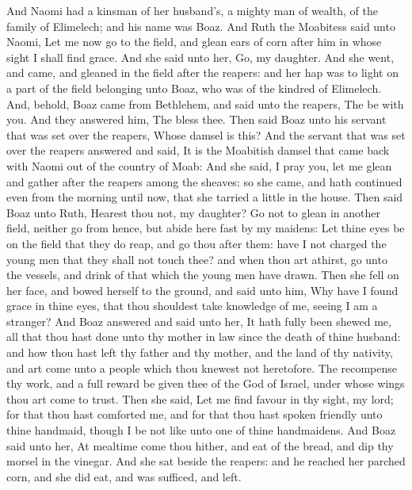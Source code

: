 \begin{biblechapter} %
 And Naomi had a kinsman of her husband's, a mighty man of wealth, of the family of Elimelech; and his name was Boaz.
\verse And Ruth the Moabitess said unto Naomi, Let me now go to the field, and glean ears of corn after him in whose sight I shall find grace. And she said unto her, Go, my daughter.
\verse And she went, and came, and gleaned in the field after the reapers: and her hap was to light on a part of the field belonging unto Boaz, who was of the kindred of Elimelech.
\verse And, behold, Boaz came from Bethlehem, and said unto the reapers, The \LORD be with you. And they answered him, The \LORD bless thee.
\verse Then said Boaz unto his servant that was set over the reapers, Whose damsel is this?
\verse And the servant that was set over the reapers answered and said, It is the Moabitish damsel that came back with Naomi out of the country of Moab:
\verse And she said, I pray you, let me glean and gather after the reapers among the sheaves: so she came, and hath continued even from the morning until now, that she tarried a little in the house.
\verse Then said Boaz unto Ruth, Hearest thou not, my daughter? Go not to glean in another field, neither go from hence, but abide here fast by my maidens:
\verse Let thine eyes be on the field that they do reap, and go thou after them: have I not charged the young men that they shall not touch thee? and when thou art athirst, go unto the vessels, and drink of that which the young men have drawn.
\verse Then she fell on her face, and bowed herself to the ground, and said unto him, Why have I found grace in thine eyes, that thou shouldest take knowledge of me, seeing I am a stranger?
\verse And Boaz answered and said unto her, It hath fully been shewed me, all that thou hast done unto thy mother in law since the death of thine husband: and how thou hast left thy father and thy mother, and the land of thy nativity, and art come unto a people which thou knewest not heretofore.
\verse The \LORD recompense thy work, and a full reward be given thee of the \LORD God of Israel, under whose wings thou art come to trust.
\verse Then she said, Let me find favour in thy sight, my lord; for that thou hast comforted me, and for that thou hast spoken friendly unto thine handmaid, though I be not like unto one of thine handmaidens.
\verse And Boaz said unto her, At mealtime come thou hither, and eat of the bread, and dip thy morsel in the vinegar. And she sat beside the reapers: and he reached her parched corn, and she did eat, and was sufficed, and left.

\end{biblechapter}
